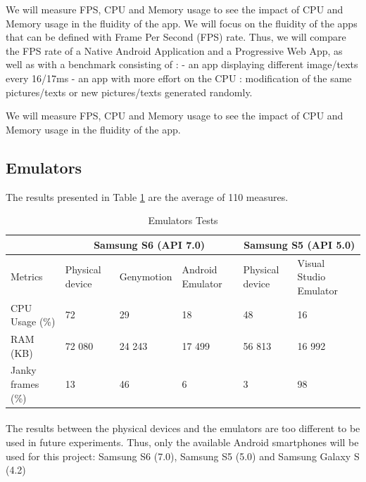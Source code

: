 \newline
\fi

We will measure FPS, CPU and Memory usage to see the impact of CPU and Memory usage in the fluidity of the app.
\newline
We will focus on the fluidity of the apps that can be defined with Frame Per Second (FPS) rate.
Thus, we will compare the FPS rate of a Native Android Application and a Progressive Web App, as well as with a benchmark consisting of : 
    - an app displaying different image/texts every 16/17ms
    - an app with more effort on the CPU : modification of the same pictures/texts or new pictures/texts generated randomly.
\newline

We will measure FPS, CPU and Memory usage to see the impact of CPU and Memory usage in the fluidity of the app.
\newline

\subsection{Emulators}
\iffalse
The results presented in Table \ref{tab:memulators_test} are the average of 110 measures.

\begin{table}[!ht]
    \begin{tabular}{|m{}|m{2cm}|m{2cm}|m{2cm}||m{2cm}|m{}|}
        \hline
         & \multicolumn{3}{c||}{Samsung S6 (API 7.0)} & \multicolumn{2}{|c|}{Samsung S5 (API 5.0)}  \\
         \hline
         Metrics & Physical device & Genymotion & Android Emulator & Physical device & Visual Studio Emulator \\
         \hline
         CPU Usage (\%) & 72 & 29 & 18 & 48 & 16 \\
         \hline
         RAM (KB) & 72 080 & 24 243 & 17 499 & 56 813 & 16 992 \\
         \hline
         Janky frames (\%) & 13 & 46 & 6 & 3 & 98 \\
         \hline
    \end{tabular}
    \caption{Emulators Tests}
    \label{tab:memulators_test}
\end{table}

\paragraph{}
The results between the physical devices and the emulators are too different to be used in future experiments. Thus, only the available Android smartphones will be used for this project: Samsung S6 (7.0), Samsung S5 (5.0) and Samsung Galaxy S (4.2)

